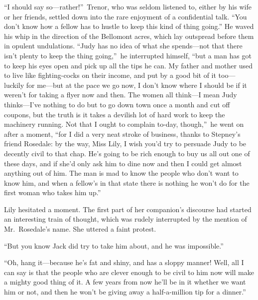 \documentclass[12pt,a4paper]{book}
\begin{document}
``I should say so---rather!''\ Trenor, who was seldom listened to,
either by his wife or her friends, settled down into the rare
enjoyment of a confidential talk. ``You don't know how a fellow
has to hustle to keep this kind of thing going.'' He waved his
whip in the direction of the Bellomont acres, which lay outspread
before them in opulent undulations. ``Judy has no idea of what she
spends---not that there isn't plenty to keep the thing going,''\ he
interrupted himself, ``but a man has got to keep his eyes open and
pick up all the tips he can. My father and mother used to live
like fighting-cocks on their income, and put by a good bit of it
too---luckily for me---but at the pace we go now, I don't know
where I should be if it weren't for taking a flyer now and then. 
The women all think---I mean Judy thinks---I've nothing to do but
to go down town once a month and cut off coupons, but the truth
is it takes a devilish lot of hard work to keep the machinery
running. Not that I ought to complain to-day, though,''\ he went on
after a moment, ``for I did a very neat stroke of business, thanks
to Stepney's friend Rosedale: by the way, Miss Lily, I wish you'd
try to persuade Judy to be decently civil to that chap. He's
going to be rich enough to buy us all out one of these
days, and if she'd only ask him to dine now and then I could get
almost anything out of him. The man is mad to know the people who
don't want to know him, and when a fellow's in that state there
is nothing he won't do for the first woman who takes him up.''





Lily hesitated a moment. The first part of her companion's
discourse had started an interesting train of thought, which was
rudely interrupted by the mention of Mr.\ Rosedale's name. She
uttered a faint protest.





``But you know Jack did try to take him about, and he was
impossible.''





``Oh, hang it---because he's fat and shiny, and has a sloppy
manner! Well, all I can say is that the people who are clever
enough to be civil to him now will make a mighty good thing of
it. A few years from now he'll be in it whether we want him or
not, and then he won't be giving away a half-a-million tip for a
dinner.''
\end{document}
